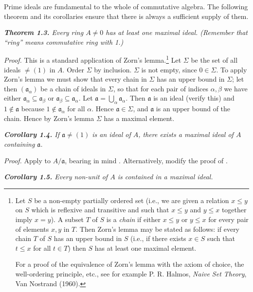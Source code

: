 Prime ideals are fundamental to the whole of commutative algebra.  The
following theorem and its corollaries ensure that there is always a sufficient
supply of them.

\medskip
\noindent\textit{\textbf{Theorem 1.3.} Every ring $A\ne0$ has at least one maximal ideal. (Remember
that ``ring'' means commutative ring with 1.)}

\noindent\emph{Proof.}  This is a standard application of Zorn's lemma.\footnote{Let $S$ be a non-empty partially ordered set (i.e., we are given a relation $x\leq y$ on $S$
which is reflexive and transitive and such that $x\leq y$ and $y\leq x$ together imply
$x=y$).  A subset $T$ of $S$ is a \emph{chain} if either $x\leq y$ or $y\leq x$ for every pair of elements
$x,y$ in $T$.  Then Zorn's lemma may be stated as follows: if every chain $T$ of $S$ has an
upper bound in $S$ (i.e., if there exists $x\in S$ such that $t\leq x$ for all $t\in T$) then $S$ has
at least one maximal element.

For a proof of the equivalence of Zorn's lemma with the axiom of choice, the
well-ordering principle, etc., see for example P. R. Halmos, \emph{Naive Set Theory},
Van Nostrand (1960).} Let $\Sigma$ be the set of all
ideals $\ne(1)$ in $A$.  Order $\Sigma$ by inclusion.  $\Sigma$ is not empty, since $0\in\Sigma$.  To apply
Zorn's lemma we must show that every chain in $\Sigma$ has an upper bound in $\Sigma$;
let then $(\mathfrak a_\alpha)$ be a chain of ideals in $\Sigma$, so that for each pair of indices $\alpha,\beta$ we have
either $\mathfrak a_\alpha\subseteq\mathfrak a_\beta$ or $\mathfrak a_\beta\subseteq\mathfrak a_\alpha$.  Let $\mathfrak a=\bigcup_\alpha\mathfrak a_\alpha$.  Then $\mathfrak a$ is an ideal (verify this) and
$1\notin\mathfrak a$ because $1\notin\mathfrak a_\alpha$ for all $\alpha$.  Hence $\mathfrak a\in\Sigma$, and $\mathfrak a$ is an upper bound of the chain.
Hence by Zorn's lemma $\Sigma$ has a maximal element.\proofbox

\medskip
\noindent\textit{\textbf{Corollary 1.4.} If $\mathfrak a\ne(1)$ is an ideal of $A$, there exists a maximal ideal of $A$
containing $\mathfrak a$.}

\noindent\emph{Proof.}  Apply  to $A/\mathfrak a$, bearing in mind .  Alternatively, modify the
proof of .\proofbox

\medskip
\noindent\textit{\textbf{Corollary 1.5.} Every non-unit of $A$ is contained in a maximal ideal.}\proofbox

